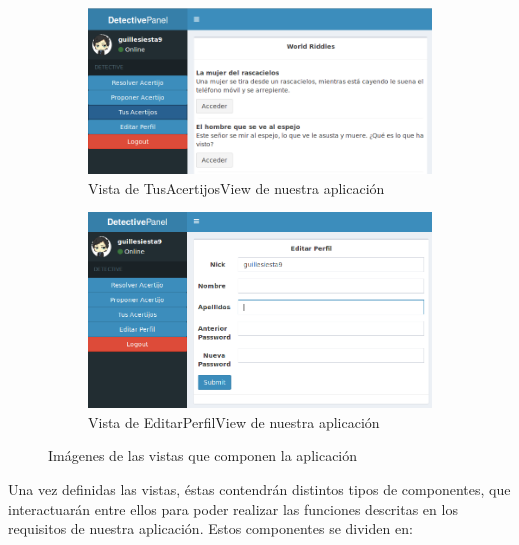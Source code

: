 \begin{figure}[hbtp]
\begin{subfigure}{.6\textwidth}
    \includegraphics[width=\linewidth]{figuras/tusacertijosview.png}
    \caption{Vista de TusAcertijosView de nuestra aplicación}
    \label{fig::tusacertijosview}
\end{subfigure}

\begin{subfigure}{.6\textwidth}
    \includegraphics[width=\linewidth]{figuras/editarperfilview.png}
    \caption{Vista de EditarPerfilView de nuestra aplicación} 
    \label{fig::editarperfilview}
\end{subfigure}
\caption{Imágenes de las vistas que componen la aplicación}
\label{fig::vistas}
\end{figure}

Una vez definidas las vistas, éstas contendrán distintos tipos de componentes, que interactuarán entre ellos para poder realizar las funciones descritas en los requisitos de nuestra aplicación. Estos componentes se dividen en:

